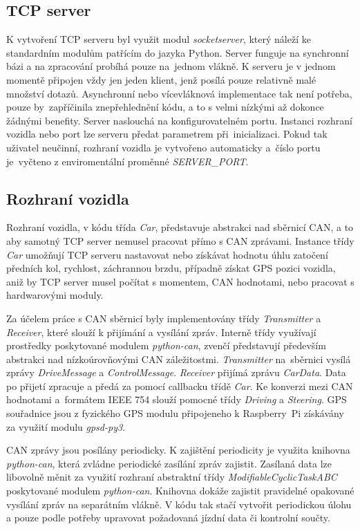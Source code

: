 \documentclass[czech, bachelor]{diploma}
\begin{document}
\subsection{TCP server}
K vytvoření TCP serveru byl využit modul \emph{socketserver}, který náleží ke standardním modulům patřícím do jazyka Python.
Server funguje na synchronní bázi a na zpracování probíhá pouze na~jednom vlákně. K serveru je v jednom momentě připojen vždy jen
jeden klient, jenž posílá pouze relativně malé množství dotazů. Asynchronní nebo vícevláknová implementace tak není potřeba,
pouze by~zapříčinila znepřehlednění kódu, a to s velmi nízkými až dokonce žádnými benefity. Server naslouchá na konfigurovatelném
portu. Instanci rozhraní vozidla nebo port lze serveru předat parametrem při~inicializaci. Pokud tak uživatel neučinní, rozhraní
vozidla je vytvořeno automaticky a~číslo portu je~vyčteno z enviromentální proměnné \emph{SERVER\_PORT}.

\subsection{Rozhraní vozidla}
Rozhraní vozidla, v kódu třída \emph{Car}, představuje abstrakci nad sběrnicí CAN, a to aby samotný TCP server nemusel pracovat
přímo s CAN zprávami. Instance třídy \emph{Car} umožňují TCP serveru nastavovat nebo získávat hodnotu úhlu zatočení předních kol,
rychlost, záchrannou brzdu, případně získat GPS pozici vozidla, aniž by TCP server musel počítat s momentem, CAN hodnotami, nebo
pracovat s hardwarovými moduly.

Za účelem práce s CAN sběrnicí byly implementovány třídy \emph{Transmitter} a \emph{Receiver}, které slouží k přijímání a vysílání
zpráv. Interně třídy využívají prostředky poskytované modulem \emph{python-can}, zvenčí představují především abstrakci
nad nízkoúrovňovými CAN záležitostmi. \emph{Transmitter} na~sběrnici vysílá zprávy \emph{DriveMessage} a \emph{ControlMessage}.
\emph{Receiver} přijímá zprávu \emph{CarData}. Data po přijetí zpracuje a předá za pomocí callbacku třídě \emph{Car}. Ke konverzi
mezi CAN hodnotami a~formátem IEEE 754 slouží pomocné třídy \emph{Driving} a \emph{Steering}. GPS souřadnice jsou z fyzického GPS
modulu připojeneho k Raspberry~Pi získávány za využití modulu \emph{gpsd-py3}.

CAN zprávy jsou posílány periodicky. K zajištění periodicity je využita knihovna \emph{python-can}, která zvládne periodické
zasílání zpráv zajistit. Zasílaná data lze libovolně měnit za využití rozhraní abstraktní třídy \emph{ModifiableCyclicTaskABC}
poskytované modulem \emph{python-can}. Knihovna dokáže zajistit pravidelné opakované vysílání zpráv na separátním vlákně. V kódu
tak stačí vytvořit periodickou úlohu a pouze podle potřeby upravovat požadovaná jízdní data či kontrolní součty.
\end{document}
